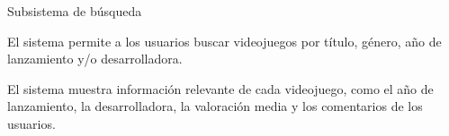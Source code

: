 \begin{functional}
    \item Subsistema de búsqueda
    \begin{functional}
        \item El sistema permite a los usuarios buscar videojuegos por título, género, año de lanzamiento y/o desarrolladora.
        \item El sistema muestra información relevante de cada videojuego, como el año de lanzamiento, la desarrolladora, la valoración media y los comentarios de los usuarios.
    \end{functional}

\end{functional}